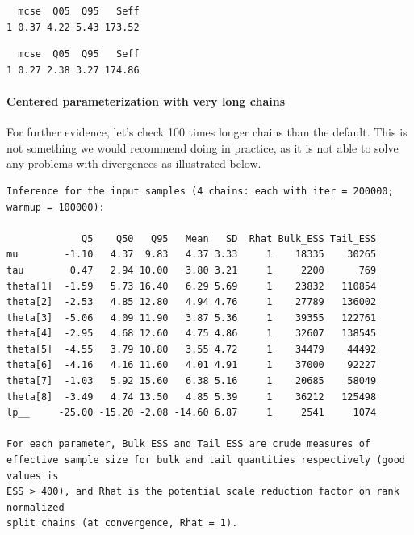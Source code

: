 \documentclass[american,]{article}
\let\oldparagraph\paragraph
\renewcommand{\paragraph}[1]{\oldparagraph{#1}\mbox{}}
\begin{document}
\begin{verbatim}
  mcse  Q05  Q95   Seff
1 0.37 4.22 5.43 173.52
\end{verbatim}

\begin{verbatim}
  mcse  Q05  Q95   Seff
1 0.27 2.38 3.27 174.86
\end{verbatim}

\hypertarget{centered-parameterization-with-very-long-chains}{%
\paragraph{Centered parameterization with very long
chains}\label{centered-parameterization-with-very-long-chains}}

For further evidence, let's check 100 times longer chains than the
default. This is not something we would recommend doing in practice, as
it is not able to solve any problems with divergences as illustrated
below.

\begin{verbatim}
Inference for the input samples (4 chains: each with iter = 200000; warmup = 100000):

             Q5    Q50   Q95   Mean   SD  Rhat Bulk_ESS Tail_ESS
mu        -1.10   4.37  9.83   4.37 3.33     1    18335    30265
tau        0.47   2.94 10.00   3.80 3.21     1     2200      769
theta[1]  -1.59   5.73 16.40   6.29 5.69     1    23832   110854
theta[2]  -2.53   4.85 12.80   4.94 4.76     1    27789   136002
theta[3]  -5.06   4.09 11.90   3.87 5.36     1    39355   122761
theta[4]  -2.95   4.68 12.60   4.75 4.86     1    32607   138545
theta[5]  -4.55   3.79 10.80   3.55 4.72     1    34479    44492
theta[6]  -4.16   4.16 11.60   4.01 4.91     1    37000    92227
theta[7]  -1.03   5.92 15.60   6.38 5.16     1    20685    58049
theta[8]  -3.49   4.74 13.50   4.85 5.39     1    36212   125498
lp__     -25.00 -15.20 -2.08 -14.60 6.87     1     2541     1074

For each parameter, Bulk_ESS and Tail_ESS are crude measures of 
effective sample size for bulk and tail quantities respectively (good values is 
ESS > 400), and Rhat is the potential scale reduction factor on rank normalized
split chains (at convergence, Rhat = 1).
\end{verbatim}
\end{document}
